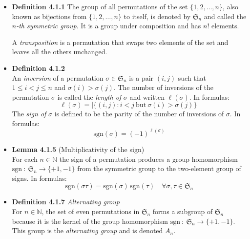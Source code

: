 \documentclass[11pt,a4paper]{article}
\begin{document}
\begin{itemize}
    \item \textbf{Definition 4.1.1}
        The group of all permutations of the set $\{1,2,\ldots,n\}$, also known as bijections from
        $\{1,2,\ldots,n\}$ to itself, is denoted by $\mathfrak{S}_n$ and called the
        \emph{$n$-th symmetric group}.
        It is a group under composition and has $n$! elements.

        A \emph{transposition} is a permutation that swaps two elements of the set
        and leaves all the others unchanged.

    \item \textbf{Definition 4.1.2} \\
        An \emph{inversion} of a permutation $\sigma \in \mathfrak{S}_n$ is a pair $(i,j)$
        such that $1 \leq i < j \leq n$ and $\sigma(i) > \sigma(j)$.
        The number of inversions of the permutation $\sigma$ is called the \emph{length of}
        $\sigma$ and written $\ell(\sigma)$.
        In formulas:
        \[
            \ell(\sigma) = |\{(i,j) : i < j \ \mathrm{but} \ \sigma(i) > \sigma(j) \}|
        \]
        The \emph{sign of} $\sigma$ is defined to be the parity of the number of inversions of 
        $\sigma$.
        In formulas:
        \[
            \mathrm{sgn}(\sigma) = {(-1)}^{\ell(\sigma)}
        \]

    \item \textbf{Lemma 4.1.5} (Multiplicativity of the sign) \\
        For each $n \in \mathbb{N}$ the sign of a permutation produces a group homomorphism
        $\mathrm{sgn} \ : \ \mathfrak{S}_n \to \{+1, -1\}$
        from the symmetric group to the two-element group of signs.
        In formulas:
        \[
            \mathrm{sgn}(\sigma \tau) = \mathrm{sgn}(\sigma) \, \mathrm{sgn}(\tau) \quad
            \forall \sigma, \tau \in \mathfrak{S}_n
        \]

    \item \textbf{Definition 4.1.7} \emph{Alternating group} \\
        For $n \in \mathbb{N}$, the set of even permutations in $\mathfrak{S}_n$ forms a subgroup
        of $\mathfrak{S}_n$ because it is the kernel of the group homomorphism
        $\mathrm{sgn} \ : \ \mathfrak{S}_n \to \{+1, -1\}$.
        This group is the \emph{alternating group} and is denoted $A_n$.

\end{itemize}
\end{document}
